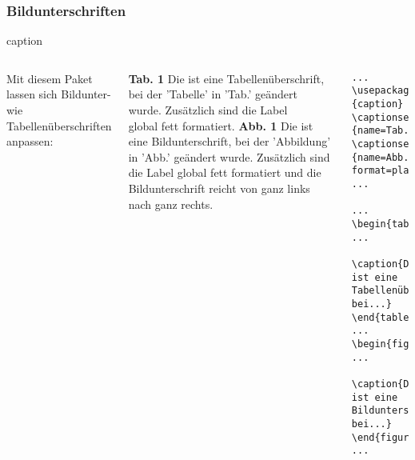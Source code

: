 \subsubsection{Bildunterschriften}
\begin{frame}[fragile]{caption}

\begin{columns}[c]

    Mit diesem Paket lassen sich Bildunter- wie Tabellenüberschriften anpassen:
\vspace{\baselineskip}\linebreak

    \begin{outputbox}
\textbf{Tab. 1} Die ist eine Tabellenüberschrift, \\
\hspace{6ex}bei der 'Tabelle' in 'Tab.' geändert \\
\hspace{6ex}wurde. Zusätzlich sind die Label \\
\hspace{6ex}global fett formatiert.  
\vspace{\baselineskip}\linebreak 
\textbf{Abb. 1} Die ist eine Bildunterschrift, bei der 'Abbildung' in 'Abb.' geändert 
wurde. Zusätzlich sind die Label global fett formatiert und die Bildunterschrift reicht von ganz links nach ganz rechts.
\end{outputbox}



\begin{lstlisting}[]
...
\usepackage[labelfont=bf]{caption}
\captionsetup[table]{name=Tab.}  
\captionsetup[figure]{name=Abb., format=plain}
...

...
\begin{table}
...
  \caption{Die ist eine Tabellenüberschrift, bei...}
\end{table} 
... 
\begin{figure}
...
  \caption{Die ist eine Bildunterschrift, bei...}
\end{figure} 
...

\end{lstlisting}

    
	\end{columns}


\end{frame}


